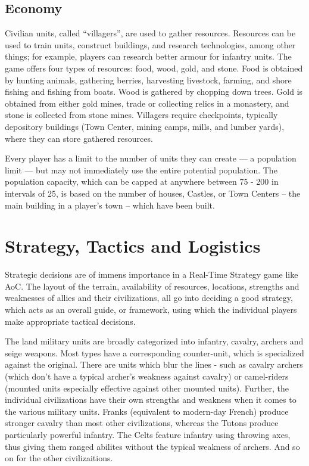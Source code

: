 \documentclass[a4paper,12pt]{article}
\begin{document}
\subsection*{Economy}
Civilian units, called ``villagers'', are used to gather resources. Resources can be used to train units, 
construct buildings, and research technologies, among other things; for example, players can research 
better armour for infantry units. The game offers four types of resources: food, wood, gold, and stone. 
Food is obtained by hunting animals, gathering berries, harvesting livestock, farming, and shore fishing 
and fishing from boats. Wood is gathered by chopping down trees. Gold is obtained from either gold 
mines, trade or collecting relics in a monastery, and stone is collected from stone mines. Villagers 
require checkpoints, typically depository buildings (Town Center, mining camps, mills, and lumber yards), 
where they can store gathered resources.

Every player has a limit to the number of units they can create — a population limit — but may not 
immediately use the entire potential population. The population capacity, which can be capped at 
anywhere between 75 - 200 in intervals of 25, is based on the number of houses, Castles, or Town Centers
-- the main building in a player's town -- which have been built.

\section*{Strategy, Tactics and Logistics}
Strategic decisions are of immens importance in a Real-Time Strategy game like AoC. The layout of the
terrain, availability of resources, locations, strengths and weaknesses of allies and their civilizations,
all go into deciding a good strategy, which acts as an overall guide, or framework,  using which the 
individual players make appropriate tactical decisions.

The land military units are broadly categorized into infantry, cavalry, archers and seige weapons.
Most types have a corresponding counter-unit, which is specialized against the original. There are
units which blur the lines - such as cavalry archers (which don't have a typical archer's weakness 
against cavalry) or camel-riders (mounted units especially effective against other mounted units).
Further, the individual civilizations have their own strengths and weakness when it comes to the
various military units. Franks (equivalent to modern-day French) produce stronger cavalry than most other
civilizations, whereas the Tutons produce particularly powerful infantry. The Celts feature infantry 
using throwing axes, thus giving them ranged abilites without the typical weakness of archers. And so
on for the other civilizaitions.
\end{document}
